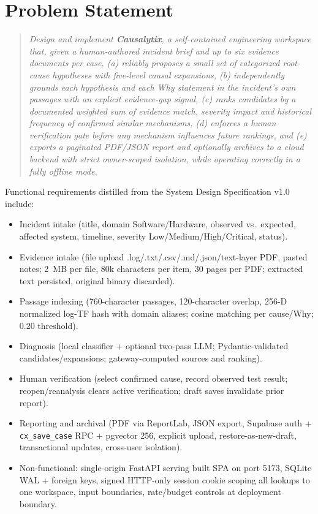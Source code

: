 \documentclass[12pt,a4paper,oneside]{report}
\begin{document}
\section{Problem Statement}
\label{sec:problem}

\begin{quote}
\textit{Design and implement \textbf{Causalytix}, a self-contained engineering workspace that, given a human-authored incident brief and up to six evidence documents per case, (a) reliably proposes a small set of categorized root-cause hypotheses with five-level causal expansions, (b) independently grounds each hypothesis and each Why statement in the incident's own passages with an explicit evidence-gap signal, (c) ranks candidates by a documented weighted sum of evidence match, severity impact and historical frequency of confirmed similar mechanisms, (d) enforces a human verification gate before any mechanism influences future rankings, and (e) exports a paginated PDF/JSON report and optionally archives to a cloud backend with strict owner-scoped isolation, while operating correctly in a fully offline mode.}
\end{quote}

Functional requirements distilled from the System Design Specification v1.0 include:

\begin{itemize}
\item Incident intake (title, domain Software/Hardware, observed vs.\ expected, affected system, timeline, severity Low/Medium/High/Critical, status).
\item Evidence intake (file upload .log/.txt/.csv/.md/.json/text-layer PDF, pasted notes; 2~MB per file, 80k characters per item, 30 pages per PDF; extracted text persisted, original binary discarded).
\item Passage indexing (760-character passages, 120-character overlap, 256-D normalized log-TF hash with domain aliases; cosine matching per cause/Why; 0.20 threshold).
\item Diagnosis (local classifier + optional two-pass LLM; Pydantic-validated candidates/expansions; gateway-computed sources and ranking).
\item Human verification (select confirmed cause, record observed test result; reopen/reanalysis clears active verification; draft saves invalidate prior report).
\item Reporting and archival (PDF via ReportLab, JSON export, Supabase auth + \texttt{cx\_save\_case} RPC + pgvector 256, explicit upload, restore-as-new-draft, transactional updates, cross-user isolation).
\item Non-functional: single-origin FastAPI serving built SPA on port 5173, SQLite WAL + foreign keys, signed HTTP-only session cookie scoping all lookups to one workspace, input boundaries, rate/budget controls at deployment boundary.
\end{itemize}
\end{document}
